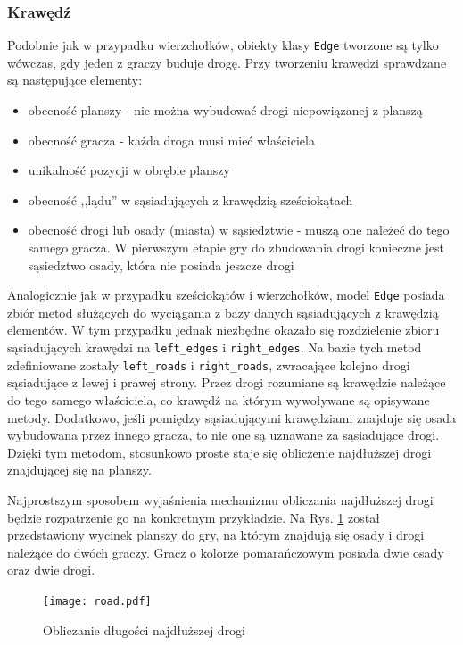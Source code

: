 \documentclass[a4paper,12pt]{article}
\providecommand{\imref}[1]{Rys. \ref{#1}} %
\begin{document}
\subsubsection{Krawędź}

Podobnie jak w przypadku wierzchołków, obiekty klasy \texttt{Edge}
tworzone są tylko wówczas, gdy jeden z graczy buduje drogę. Przy
tworzeniu krawędzi sprawdzane są następujące elementy:

\begin{itemize}
\item obecność planszy - nie można wybudować drogi niepowiązanej z
  planszą
\item obecność gracza - każda droga musi mieć właściciela
\item unikalność pozycji w obrębie planszy
\item obecność ,,lądu'' w sąsiadujących z krawędzią sześciokątach
\item obecność drogi lub osady (miasta) w sąsiedztwie - muszą one
  należeć do tego samego gracza. W pierwszym etapie gry do zbudowania
  drogi konieczne jest sąsiedztwo osady, która nie posiada jeszcze
  drogi
\end{itemize}

Analogicznie jak w przypadku sześciokątów i wierzchołków, model
\texttt{Edge} posiada zbiór metod służących do wyciągania z bazy
danych sąsiadujących z krawędzią elementów. W tym przypadku jednak
niezbędne okazało się rozdzielenie zbioru sąsiadujących krawędzi na
\texttt{left\_edges} i \texttt{right\_edges}. Na bazie tych metod
zdefiniowane zostały \texttt{left\_roads} i \texttt{right\_roads},
zwracające kolejno drogi sąsiadujące z lewej i prawej strony. Przez
drogi rozumiane są krawędzie należące do tego samego właściciela, co
krawędź na którym wywoływane są opisywane metody. Dodatkowo, jeśli
pomiędzy sąsiadującymi krawędziami znajduje się osada wybudowana przez
innego gracza, to nie one są uznawane za sąsiadujące drogi. Dzięki tym
metodom, stosunkowo proste staje się obliczenie najdłuższej drogi
znajdującej się na planszy.

Najprostszym sposobem wyjaśnienia mechanizmu obliczania najdłuższej
drogi będzie rozpatrzenie go na konkretnym przykładzie. Na
\imref{road} został przedstawiony wycinek planszy do gry, na którym
znajdują się osady i drogi należące do dwóch graczy. Gracz
o kolorze pomarańczowym posiada dwie osady oraz dwie drogi.

\begin{figure}[ht]
  \begin{center}
    \texttt{[image: road.pdf]}
  \end{center}
  \caption{Obliczanie długości najdłuższej drogi}
  \label{road}
\end{figure}
\end{document}
